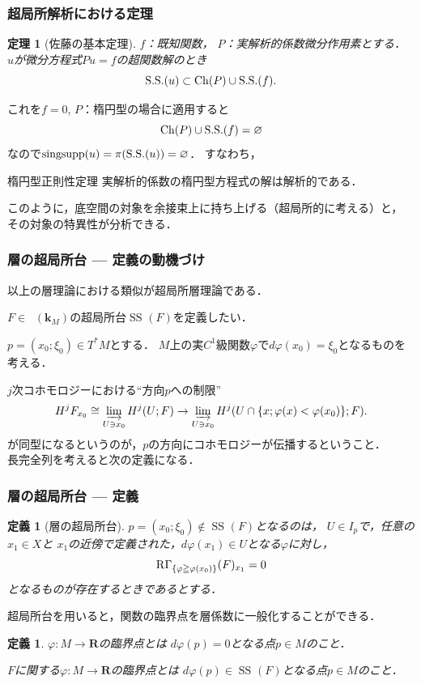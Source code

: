 \documentclass[dvipdfmx,10pt,aspectratio=169,leqno]{beamer}%
\newcommand{\rr}{\mathbf{R}}
\newcommand{\kk}{\mathbf{k}}
\numberwithin{equation}{subsection}
\newcommand{\Dompb}{\mathop{\mathsf{D}^\mathrm{b}}\nolimits}
\newcommand{\muS}[1][]{\mathop{\mathrm{SS}}\nolimits_{#1}}
\newcommand{\RG}{\mathop{\mathrm{R}\hspace{-0pt}\Gamma}\nolimits}
\newcommand{\indlim}[1][]{\mathop{\varinjlim}\limits_{#1}}
\newcommand{\cotb}[1][]{T^{\ast}{#1}}
\theoremstyle{mystyle}
\newtheorem{DFN}[AXM]{定義}
\newtheorem{THM}[AXM]{定理}
\begin{document}
\begin{frame}\frametitle{超局所解析における定理} 
    \begin{THM}[佐藤の基本定理{\cite{Sato69,Sato70}}]
        \(f\)：既知関数，
        \(P\)：実解析的係数微分作用素とする．
        \(u\)が微分方程式\(Pu=f\)の超関数解のとき
        \[
            \mathop{\mathrm{S.S.}}\nolimits(u)\subset \mathop{\mathrm{Ch}}\nolimits(P)\cup\mathop{\mathrm{S.S.}}\nolimits(f).
        \]
    \end{THM}
    これを\(f=0\), \(P\)：楕円型の場合に適用すると
    \[
        \mathop{\mathrm{Ch}}\nolimits(P)\cup \mathop{\mathrm{S.S.}}\nolimits(f)=\varnothing
    \]
    なので\(\mathop{\mathrm{singsupp}}\nolimits(u)=\pi(\mathop{\mathrm{S.S.}}\nolimits(u))=\varnothing\)．
    すなわち，
    \begin{alertblock}{楕円型正則性定理}
        実解析的係数の楕円型方程式の解は解析的である．
    \end{alertblock}
    このように，底空間の対象を余接束上に持ち上げる（超局所的に考える）と，
    その対象の特異性が分析できる．
\end{frame}

\begin{frame}\frametitle{層の超局所台 --- 定義の動機づけ}
    以上の層理論における類似が超局所層理論である．

    \(F\in\Dompb(\kk_M)\)の超局所台\(\muS(F)\)を定義したい．

    \(p=(x_0;\xi_0)\in\cotb[M]\)とする．
    \(M\)上の実\(C^1\)級関数\(\varphi\)で\(
        d\varphi(x_0)=\xi_0
    \)となるものを考える．

    \(j\)次コホモロジーにおける``方向\(p\)への制限''
    \[
        H^{j}F_{x_{0}}\cong \indlim[U\ni x_{0}]H^{j}(U;F)
        \to
        \indlim[U\ni x_{0}]H^j(U\cap\{x;\varphi(x)<\varphi(x_0)\};F).
    \]
    が同型になるというのが，\(p\)の方向にコホモロジーが伝播するということ．\\
    長完全列を考えると次の定義になる．
\end{frame}


\begin{frame}\frametitle{層の超局所台 --- 定義}
    \begin{DFN}[層の超局所台]
        \(p=(x_0;\xi_0)\notin \muS(F)\)となるのは，
        \(U\in I_{p}\)で，任意の\(x_1\in X\)と
        \(x_1\)の近傍で定義された，\(
            d\varphi(x_1)\in U
        \)となる\(\varphi\)に対し，\[
            \RG_{\{\varphi\geqq\varphi(x_0)\}}(F)_{x_1}=0
        \]
        となるものが存在するときであるとする．
    \end{DFN}
    超局所台を用いると，関数の臨界点を層係数に一般化することができる．
    \begin{DFN}
        \(\varphi\colon M\to \rr\)の臨界点とは
        \(d\varphi(p)=0\)となる点\(p\in M\)のこと．

        \(F\)に関する\(\varphi\colon M\to \rr\)の臨界点とは
        \(d\varphi(p)\in\muS[](F)\)となる点\(p\in M\)のこと．
    \end{DFN}
\end{frame}
\end{document}
